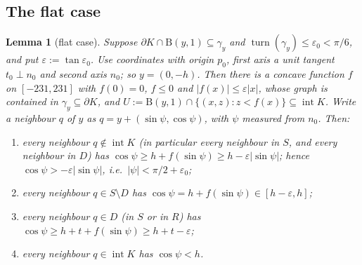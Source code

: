 \documentclass[11pt]{amsart}
\newtheorem{lemma}[theorem]{Lemma}
\theoremstyle{definition}
\theoremstyle{remark}
\newcommand{\eps}{\varepsilon}
\newcommand{\turn}{\operatorname{turn}}
\newcommand{\Dd}{\mathrm{B}}      %
\begin{document}
\subsection{The flat case}
\begin{lemma}[flat case]\label{lem:flat}
Suppose $\partial K\cap\Dd(y,1)\subseteq\gamma_y$ and $\turn(\gamma_y)\le\eps_0<\pi/6$, and put $\eps:=\tan\eps_0$. Use coordinates with origin $p_0$, first axis a unit tangent $t_0\perp n_0$ and second axis $n_0$; so $y=(0,-h)$. Then there is a concave function $f$ on $[-231,231]$ with $f(0)=0$, $f\le0$ and $|f(x)|\le\eps|x|$, whose graph is contained in $\gamma_y\subseteq\partial K$, and $U:=\Dd(y,1)\cap\{(x,z):z<f(x)\}\subseteq\operatorname{int}K$. Write a neighbour $q$ of $y$ as $q=y+(\sin\psi,\cos\psi)$, with $\psi$ measured from $n_0$. Then:
\begin{enumerate}[label=\textup{(F\arabic*)},leftmargin=3em]
\item every neighbour $q\notin\operatorname{int}K$ (in particular every neighbour in $S$, and every neighbour in $D$) has $\cos\psi\ge h+f(\sin\psi)\ge h-\eps|\sin\psi|$; hence $\cos\psi>-\eps|\sin\psi|$, i.e.\ $|\psi|<\pi/2+\eps_0$;
\item every neighbour $q\in S\setminus D$ has $\cos\psi=h+f(\sin\psi)\in[h-\eps,h]$;
\item every neighbour $q\in D$ (in $S$ or in $R$) has $\cos\psi\ge h+t+f(\sin\psi)\ge h+t-\eps$;
\item every neighbour $q\in\operatorname{int}K$ has $\cos\psi<h$.
\end{enumerate}
\end{lemma}
\end{document}
